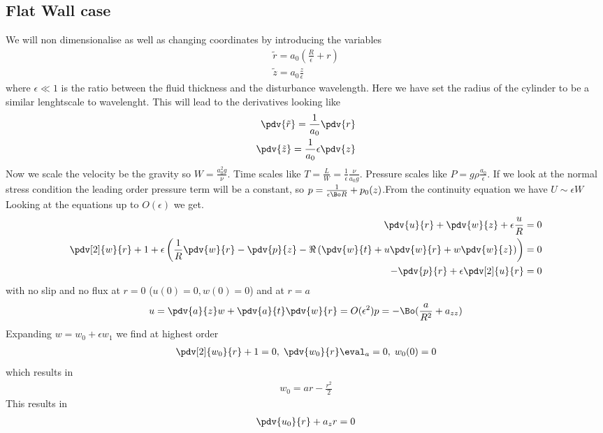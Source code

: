 \documentclass[12pt]{article}
\begin{document}
\subsection{Flat Wall case}

We will non dimensionalise as well as changing coordinates by introducing the variables 
\begin{align}
\tilde r = a_0\left(\frac{R}{\epsilon} +r\right)\\
\tilde z = a_0\frac{ z}{\epsilon}
\end{align}
where $\epsilon\ll 1$ is the ratio between the fluid thickness and the disturbance wavelength. Here we have set the radius of the cylinder to be a similar lenghtscale to wavelenght.
This will lead to the derivatives looking like
\begin{align}
\pdv{\tilde r} = \frac{1}{a_0}\pdv{r}\\
\pdv{\tilde z} =\frac{1}{a_0}\epsilon\pdv{z}
\end{align}
Now we scale the velocity be the gravity so $W = \frac{a_0^2 g}{\nu}$. Time scales like $T = \frac{L}{W} = \frac{1}{\epsilon}\frac{\nu}{a_0 g}$. Pressure scales like $P  =g\rho\frac{a_0}{\epsilon}$. If we look at the normal stress condition the leading order pressure term will be a constant, so $p = \frac{1}{\epsilon \Bo R} + p_0(z)$.From the continuity equation we have $U\sim \epsilon W$
Looking at the equations up to $O(\epsilon)$ we get.
\begin{align}
\pdv{u}{r}+\pdv{w}{z} +\epsilon\frac{u}{R}=0\\
\pdv[2]{w}{r}+1 +\epsilon\left( \frac{1}{R}\pdv{w}{r}-\pdv{p}{z}-\Re\left(\pdv{w}{t}+u\pdv{w}{r}+w\pdv{w}{z}\right)\right)=0\\
-\pdv{p}{r}+\epsilon\pdv[2]{u}{r}=0
\end{align}
with no slip and no flux at $r=0$  ($u(0) = 0, w(0) = 0$)
and at $r = a$
\begin{align}
u = \pdv{a}{z} w + \pdv{a}{t}
\pdv{w}{r} = O(\epsilon^2)
p = -\Bo(\frac{a}{R^2} +a_{zz})
\end{align}
Expanding $w = w_0+\epsilon w_1$
we find at highest order
\begin{align}
\pdv[2]{w_0}{r}+ 1 = 0, \;\pdv{w_0}{r}\eval_a  = 0, \; w_0(0) = 0
\end{align}
which results in 
\begin{align}
w_0 = ar - \frac{r^2}{2}
\end{align}
This results in 
\begin{align}
\pdv{u_0}{r} + a_z r = 0 
\end{align}
\end{document}
